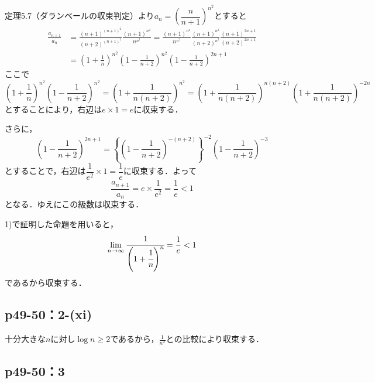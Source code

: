 \documentclass[a4paper,10pt,fleqn]{ltjsarticle}
\begin{document}
        \begin{screen}
        定理5.7（ダランベールの収束判定）より$a_n=\left(\dfrac{n}{n+1}\right)^{n^2}$とすると
        \begin{align*}
        \frac{a_{n+1}}{a_n}&=\frac{(n+1)^{(n+1)^2}}{(n+2)^{(n+1)^2}}\frac{(n+1)^{n^2}}{n^{n^2}}=\frac{(n+1)^{n^2}}{n^{n^2}}\frac{(n+1)^{n^2}}{(n+2)^{n^2}}\frac{(n+1)^{2n+1}}{(n+2)^{2n+1}}\\
        &=\left(1+\frac{1}{n}\right)^{n^2}\left(1-\frac{1}{n+2}\right)^{n^2}\left(1-\frac{1}{n+2}\right)^{2n+1}
        \end{align*}
        ここで
        \[
        \left(1+\frac{1}{n}\right)^{n^2}\left(1-\frac{1}{n+2}\right)^{n^2}=\left(1+\frac{1}{n(n+2)}\right)^{n^2}=\left(1+\frac{1}{n(n+2)}\right)^{n(n+2)}\left(1+\frac{1}{n(n+2)}\right)^{-2n}
        \]
        とすることにより，右辺は$e \times 1=e$に収束する．
        
        さらに，
        \[
        \left(1-\frac{1}{n+2}\right)^{2n+1}=\left\{\left(1-\frac{1}{n+2}\right)^{-(n+2)}\right\}^{-2}\left(1-\frac{1}{n+2}\right)^{-3}
        \]
        とすることで，右辺は$\dfrac{1}{e^2} \times 1=\dfrac{1}{e}$に収束する．よって
        \[
        \frac{a_{n+1}}{a_n}=e \times \frac{1}{e^2}=\frac{1}{e}<1
        \]
        となる．ゆえにこの級数は収束する．
    \end{screen}


    \begin{screen}
    1)で証明した命題を用いると，
    \[
      \lim _{n \to \infty} \cfrac{1}{\Bigg(1+\cfrac{1}{n}\Bigg)^n} = \frac{1}{e} < 1
    \]
    であるから収束する．
\end{screen}


\subsection*{p49-50：2-(xi)}


\begin{screen}
十分大きな$n$に対し$\log n \geq 2$であるから，$\frac{1}{n^2}$との比較により収束する．
\end{screen}

\newpage 

    \subsection*{p49-50：3}
\end{document}
